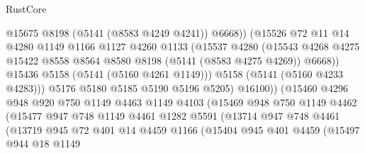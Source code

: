 \begin{lexlean}{RustCore}
\begin{coremodule}
                              @15675
                              @8198
                              (@5141 (@8583 @4249 @4241))
                              @6668))
                          (@15526
                            @72
                            @11
                            @14
                            @4280
                            @1149
                            @1166
                            @1127
                            @4260
                            @1133
                            (@15537
                              @4280
                              (@15543
                                @4268
                                @4275
                                @15422
                                @8558
                                @8564
                                @8580
                                @8198
                                (@5141 (@8583 @4275 @4269))
                                @6668))
                            @15436
                            @5158
                            (@5141 (@5160 @4261 @1149)))
                          @5158
                          (@5141 (@5160 @4233 @4283)))
                        @5176
                        @5180
                        @5185
                        @5190
                        @5196
                        @5205)
                      @16100))
                  (@15460
                    @4296
                    @948
                    @920
                    @750
                    @1149
                    @4463
                    @1149
                    @4103
                    (@15469
                      @948
                      @750
                      @1149
                      @4462
                      (@15477
                        @947
                        @748
                        @1149
                        @4461
                        @1282
                        @5591
                        (@13714
                          @947
                          @748
                          @4461
                          (@13719
                            @945
                            @72
                            @401
                            @14
                            @4459
                            @1166
                            (@15404
                              @945
                              @401
                              @4459
                              (@15497
                                @944
                                @18
                                @1149

\end{coremodule}
\end{lexlean}
